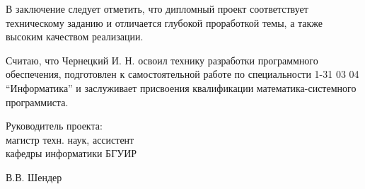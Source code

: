 \begin{singlespace}
{    В заключение следует отметить, что дипломный проект соответствует техническому заданию и отличается глубокой проработкой темы, а также высоким качеством реализации.

    Считаю, что Чернецкий И. Н. освоил технику разработки программного обеспечения, подготовлен к самостоятельной работе по специальности 1-31 03 04 ``Информатика'' и заслуживает присвоения квалификации математика-системного программиста.

    \vfill
    \noindent
    \begin{minipage}{0.55\textwidth}
      \begin{flushleft}
        Руководитель проекта:\\
        магистр техн. наук, ассистент\\
        кафедры информатики БГУИР
      \end{flushleft}
    \end{minipage}
    \begin{minipage}{0.4\textwidth}
      \begin{flushright}
        \underline{\hspace*{3cm}} В.В. Шендер
      \end{flushright}
    \end{minipage}
  }
\end{singlespace}


\newpage
